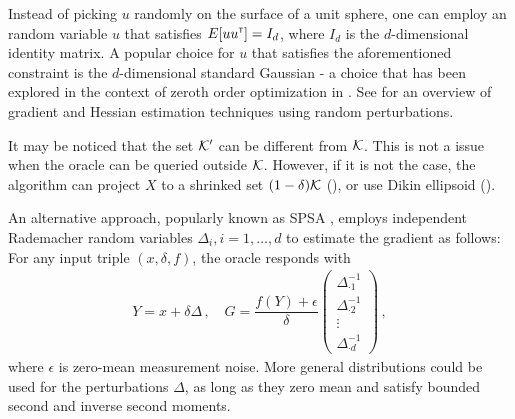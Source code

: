 \begin{remark}
 Instead of picking $u$ randomly on the surface of a unit sphere, one can employ an random variable $u$ that satisfies $E[u u^\mathsf{\scriptscriptstyle T}] = I_d$, where $I_d$ is the $d$-dimensional identity matrix. A popular choice for $u$ that satisfies the aforementioned constraint is the $d$-dimensional standard Gaussian - a choice that has been explored in the context of zeroth order optimization in \citep{duchi2015optimal}. See \citep{bhatnagar-book} for an overview of gradient and Hessian estimation techniques using random perturbations.   
\end{remark}

It may be noticed that the set $\mathcal{K}'$ can be different from $\mathcal{K}$. This is not a issue when the oracle can be queried outside $\mathcal{K}$. However, if it is not the case, the algorithm can project $X$ to a shrinked set $(1-\delta)\mathcal{K}$ (\cite{flaxman2005online}), or use Dikin ellipsoid (\cite{AbHaRa08}).

An alternative approach, popularly known as SPSA \citep{spall1997one}, employs independent Rademacher random variables $\Delta_i, i=1,\ldots,d$ to estimate the gradient as follows:
% 
For any input triple $(x, \delta, f)$, the oracle responds with
\begin{align}
Y = x+\delta \Delta \,, \quad
G = \dfrac{f(Y)+\epsilon}{\delta}\begin{pmatrix}\Delta_{\cdot1}^{-1}\\\Delta_{\cdot2}^{-1}\\ \vdots\\ \Delta_{\cdot
 d}^{-1}\end{pmatrix} \,,
 \label{eq:onespsa}
\end{align}
where $\epsilon$ is zero-mean measurement noise. More general distributions could be used for the perturbations $\Delta$, as long as they zero mean and satisfy bounded second and inverse second moments.


